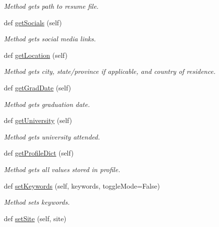 \begin{DoxyCompactItemize}
\begin{DoxyCompactList}\small\item\em Method gets path to resume file. \end{DoxyCompactList}\item 
def \hyperlink{classuserProfile_1_1userProfile_ab2a8462b4239f832cdc0bc774ca60968}{get\+Socials} (self)
\begin{DoxyCompactList}\small\item\em Method gets social media links. \end{DoxyCompactList}\item 
def \hyperlink{classuserProfile_1_1userProfile_a50577f0100db886c2c5d6cdfc61c73a6}{get\+Location} (self)
\begin{DoxyCompactList}\small\item\em Method gets city, state/province if applicable, and country of residence. \end{DoxyCompactList}\item 
def \hyperlink{classuserProfile_1_1userProfile_acdaf40b01b5086ab70b8802ba944b337}{get\+Grad\+Date} (self)
\begin{DoxyCompactList}\small\item\em Method gets graduation date. \end{DoxyCompactList}\item 
def \hyperlink{classuserProfile_1_1userProfile_a25a425c5045c07739c784f7f8dcff2af}{get\+University} (self)
\begin{DoxyCompactList}\small\item\em Method gets university attended. \end{DoxyCompactList}\item 
def \hyperlink{classuserProfile_1_1userProfile_adb914cd59899ee5fc36c23be7f2219d0}{get\+Profile\+Dict} (self)
\begin{DoxyCompactList}\small\item\em Method gets all values stored in profile. \end{DoxyCompactList}\item 
def \hyperlink{classuserProfile_1_1userProfile_ad1e2dc6aedf50cba360f2bc6669ea3f9}{set\+Keywords} (self, keywords, toggle\+Mode=False)
\begin{DoxyCompactList}\small\item\em Method sets keywords. \end{DoxyCompactList}\item 
def \hyperlink{classuserProfile_1_1userProfile_a67fc7d06910ee0cb4914884dff2ef28e}{set\+Site} (self, site)

\end{DoxyCompactItemize}
